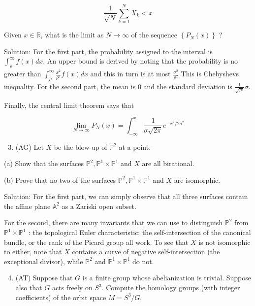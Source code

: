 \documentclass[10pt]{article}
\begin{document}
$$
\frac{1}{\sqrt{N}} \sum_{k=1}^{N} X_{k}<x
$$

Given $x \in \mathbb{R}$, what is the limit as $N \rightarrow \infty$ of the sequence $\left\{P_{N}(x)\right\}$ ?

Solution: For the first part, the probability assigned to the interval is $\int_{\rho}^{\infty} f(x) d x$. An upper bound is derived by noting that the probability is no greater than $\int_{\rho}^{\infty} \frac{x^{2}}{\rho^{2}} f(x) d x$ and this in turn is at most $\frac{\sigma^{2}}{\rho^{2}}$ This is Chebyshevs inequality. For the second part, the mean is 0 and the standard deviation is $\frac{1}{\sqrt{N}} \sigma$.

Finally, the central limit theorem says that

$$
\lim _{N \rightarrow \infty} P_{N}(x)=\int_{-\infty}^{x} \frac{1}{\sigma \sqrt{2 \pi}} e^{-x^{2} / 2 \sigma^{2}}
$$

\begin{enumerate}
  \setcounter{enumi}{2}
  \item (AG) Let $X$ be the blow-up of $\mathbb{P}^{2}$ at a point.
\end{enumerate}

(a) Show that the surfaces $\mathbb{P}^{2}, \mathbb{P}^{1} \times \mathbb{P}^{1}$ and $X$ are all birational.

(b) Prove that no two of the surfaces $\mathbb{P}^{2}, \mathbb{P}^{1} \times \mathbb{P}^{1}$ and $X$ are isomorphic.

Solution: For the first part, we can simply observe that all three surfaces contain the affine plane $\mathbb{A}^{2}$ as a Zariski open subset.

For the second, there are many invariants that we can use to distinguish $\mathbb{P}^{2}$ from $\mathbb{P}^{1} \times \mathbb{P}^{1}$ : the topological Euler characteristic; the self-intersection of the canonical bundle, or the rank of the Picard group all work. To see that $X$ is not isomorphic to either, note that $X$ contains a curve of negative self-intersection (the exceptional divisor), while $\mathbb{P}^{2}$ and $\mathbb{P}^{1} \times \mathbb{P}^{1}$ do not.

\begin{enumerate}
  \setcounter{enumi}{3}
  \item (AT) Suppose that $G$ is a finite group whose abelianization is trivial. Suppose also that $G$ acts freely on $S^{3}$. Compute the homology groups (with integer coefficients) of the orbit space $M=S^{3} / G$.
\end{enumerate}
\end{document}
